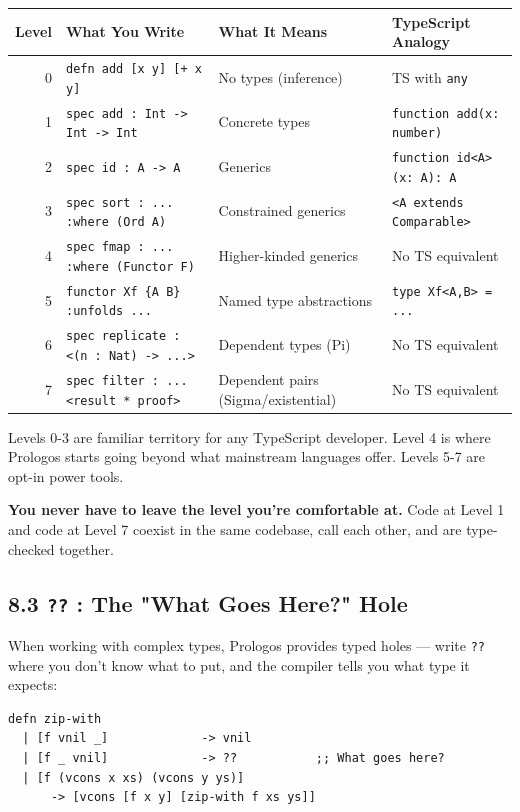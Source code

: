 \documentclass[11pt]{article}
\begin{document}
\begin{center}
\begin{tabular}{rlll}
Level & What You Write & What It Means & TypeScript Analogy\\
\hline
0 & \texttt{defn add [x y] [+ x y]} & No types (inference) & TS with \texttt{any}\\
1 & \texttt{spec add : Int -> Int -> Int} & Concrete types & \texttt{function add(x: number)}\\
2 & \texttt{spec id : A -> A} & Generics & \texttt{function id<A>(x: A): A}\\
3 & \texttt{spec sort : ... :where (Ord A)} & Constrained generics & \texttt{<A extends Comparable>}\\
4 & \texttt{spec fmap : ... :where (Functor F)} & Higher-kinded generics & No TS equivalent\\
5 & \texttt{functor Xf \{A B\} :unfolds ...} & Named type abstractions & \texttt{type Xf<A,B> = ...}\\
6 & \texttt{spec replicate : <(n : Nat) -> ...>} & Dependent types (Pi) & No TS equivalent\\
7 & \texttt{spec filter : ... <result * proof>} & Dependent pairs (Sigma/existential) & No TS equivalent\\
\end{tabular}
\end{center}

Levels 0-3 are familiar territory for any TypeScript developer. Level 4
is where Prologos starts going beyond what mainstream languages offer.
Levels 5-7 are opt-in power tools.

\textbf{You never have to leave the level you're comfortable at.} Code at
Level 1 and code at Level 7 coexist in the same codebase, call each
other, and are type-checked together.
\subsection{8.3 \texttt{??} : The "What Goes Here?" Hole}
\label{sec:org7f36f26}

When working with complex types, Prologos provides typed holes --- write
\texttt{??} where you don't know what to put, and the compiler tells you
what type it expects:

\begin{verbatim}
defn zip-with
  | [f vnil _]             -> vnil
  | [f _ vnil]             -> ??           ;; What goes here?
  | [f (vcons x xs) (vcons y ys)]
      -> [vcons [f x y] [zip-with f xs ys]]
\end{verbatim}
\end{document}
